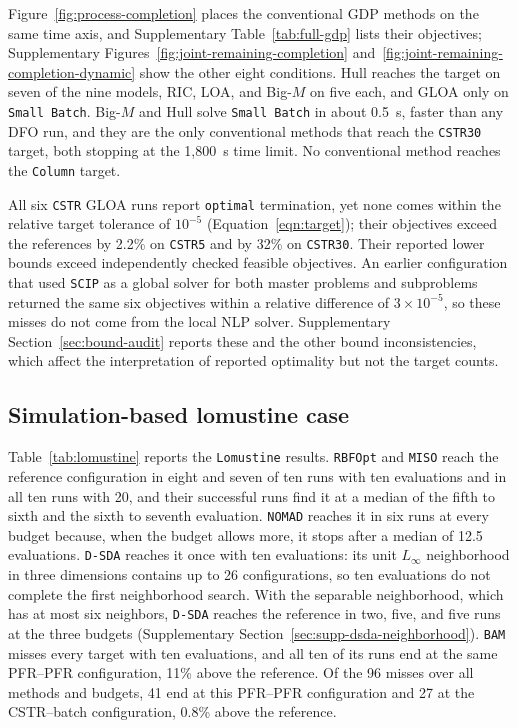\documentclass{article}
\begin{document}
Figure~\ref{fig:process-completion} places the conventional GDP methods on the same time axis, and Supplementary Table~\ref{tab:full-gdp} lists their objectives; Supplementary Figures~\ref{fig:joint-remaining-completion} and~\ref{fig:joint-remaining-completion-dynamic} show the other eight conditions.
Hull reaches the target on seven of the nine models, RIC, LOA, and Big-\(M\) on five each, and GLOA only on \texttt{Small Batch}.
Big-\(M\) and Hull solve \texttt{Small Batch} in about 0.5~s, faster than any DFO run, and they are the only conventional methods that reach the \texttt{CSTR30} target, both stopping at the 1,800~s time limit.
No conventional method reaches the \texttt{Column} target.

All six \texttt{CSTR} GLOA runs report \texttt{optimal} termination, yet none comes within the relative target tolerance of \(10^{-5}\) (Equation~\eqref{eqn:target}); their objectives exceed the references by 2.2\% on \texttt{CSTR5} and by 32\% on \texttt{CSTR30}.
Their reported lower bounds exceed independently checked feasible objectives.
An earlier configuration that used \texttt{SCIP} as a global solver for both master problems and subproblems returned the same six objectives within a relative difference of \(3\times10^{-5}\), so these misses do not come from the local NLP solver.
Supplementary Section~\ref{sec:bound-audit} reports these and the other bound inconsistencies, which affect the interpretation of reported optimality but not the target counts.

\subsection{Simulation-based lomustine case}
\label{sec:lomustine-results}
Table~\ref{tab:lomustine} reports the \texttt{Lomustine} results.
\texttt{RBFOpt} and \texttt{MISO} reach the reference configuration in eight and seven of ten runs with ten evaluations and in all ten runs with 20, and their successful runs find it at a median of the fifth to sixth and the sixth to seventh evaluation.
\texttt{NOMAD} reaches it in six runs at every budget because, when the budget allows more, it stops after a median of 12.5 evaluations.
\texttt{D-SDA} reaches it once with ten evaluations: its unit \(L_\infty\) neighborhood in three dimensions contains up to 26 configurations, so ten evaluations do not complete the first neighborhood search.
With the separable neighborhood, which has at most six neighbors, \texttt{D-SDA} reaches the reference in two, five, and five runs at the three budgets (Supplementary Section~\ref{sec:supp-dsda-neighborhood}).
\texttt{BAM} misses every target with ten evaluations, and all ten of its runs end at the same PFR--PFR configuration, 11\% above the reference.
Of the 96 misses over all methods and budgets, 41 end at this PFR--PFR configuration and 27 at the CSTR--batch configuration, 0.8\% above the reference.
\end{document}

